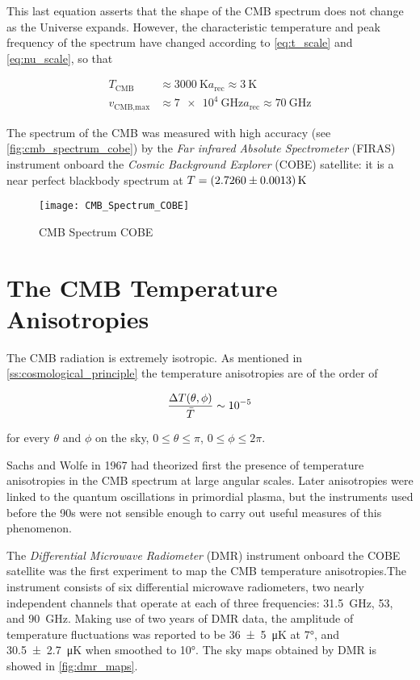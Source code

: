 This last equation asserts that the shape of the CMB spectrum does not
change as the Universe expands. However, the characteristic temperature and
peak frequency of the spectrum have changed according to
\autoref{eq:t_scale} and \autoref{eq:nu_scale}, so that

\begin{align}
        T_{\text{CMB}} & \approx \SI{3000}{\kelvin} a_{\text{rec}} \approx
        \SI{3}{\kelvin} \\
        v_{\text{CMB,max}} & \approx \SI{7e4}{\giga\hertz} a_{\text{rec}}
        \approx \SI{70}{\giga\hertz}
\end{align}

The spectrum of the CMB was measured with high accuracy
(see \autoref{fig:cmb_spectrum_cobe})
by the \emph{Far infrared Absolute Spectrometer} (FIRAS) instrument onboard
the \emph{Cosmic Background Explorer} (COBE) satellite: it is a near
perfect blackbody spectrum at $T = \SI{2.7260 \pm 0.0013}{\kelvin}$

\begin{figure}
        \centering
        \texttt{[image: CMB\_Spectrum\_COBE]}
        \caption{CMB Spectrum COBE}
        \label{fig:cmb_spectrum_cobe}
\end{figure}

\section{The CMB Temperature Anisotropies}

The CMB radiation is extremely isotropic. As mentioned in
\autoref{ss:cosmological_principle} the temperature anisotropies are of the
order of

\begin{equation}
\frac{\Delta T\qty(\theta,\phi)}{\bar T} \sim \num{e-5}
\end{equation}

for every $\theta$ and $\phi$ on the sky, $0 \leq \theta \leq \pi$,
$0 \leq \phi \leq 2\pi$.

Sachs and Wolfe in 1967 had theorized first the presence of temperature
anisotropies in the CMB spectrum at large angular scales. Later
anisotropies were linked to the quantum oscillations in primordial plasma,
but the instruments used before the 90s were not sensible enough to carry
out useful measures of this phenomenon.

The \emph{Differential Microwave Radiometer} (DMR) instrument onboard the
COBE satellite was the first experiment to map the CMB temperature
anisotropies.The instrument consists of six differential microwave
radiometers, two nearly independent channels that operate at each of three
frequencies: \SI{ 31.5}{\giga\hertz}, \num{53}, and \SI{90}{\giga\hertz}.
Making use of two years of DMR data, the amplitude of temperature fluctuations
was reported to be
\SI{36 \pm 5}{\micro\kelvin} at \ang{7}, and
\SI{30.5 \pm 2.7}{\micro\kelvin} when smoothed to \ang{10}.
The sky maps obtained by DMR is showed in \autoref{fig:dmr_maps}.

